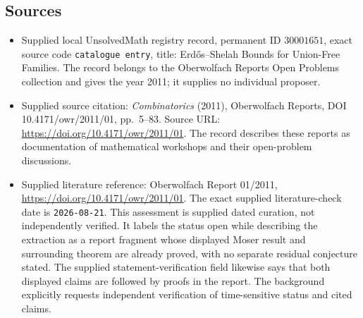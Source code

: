 \documentclass[11pt]{article}
\begin{document}
\subsection{Sources}
\begin{itemize}
\item Supplied local UnsolvedMath registry record, permanent ID \(30001651\), exact source code \texttt{catalogue entry}, title: Erd\H{o}s--Shelah Bounds for Union-Free Families. The record belongs to the Oberwolfach Reports Open Problems collection and gives the year 2011; it supplies no individual proposer.
\item Supplied source citation: \emph{Combinatorics} (2011), Oberwolfach Reports, DOI 10.4171/owr/2011/01, pp.\ 5--83. Source URL: \url{https://doi.org/10.4171/owr/2011/01}. The record describes these reports as documentation of mathematical workshops and their open-problem discussions.
\item Supplied literature reference: Oberwolfach Report 01/2011, \url{https://doi.org/10.4171/owr/2011/01}. The exact supplied literature-check date is \texttt{2026-08-21}. This assessment is supplied dated curation, not independently verified. It labels the status open while describing the extraction as a report fragment whose displayed Moser result and surrounding theorem are already proved, with no separate residual conjecture stated. The supplied statement-verification field likewise says that both displayed claims are followed by proofs in the report. The background explicitly requests independent verification of time-sensitive status and cited claims.
\end{itemize}
\end{document}
